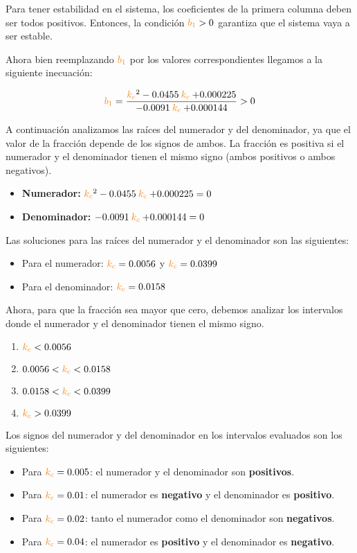 Para tener estabilidad en el sistema, los coeficientes de la primera columna
deben ser todos positivos. Entonces, la condición $\nara{b_1} > 0$ garantiza
que el sistema vaya a ser estable.

Ahora bien reemplazando $\nara{b_1}$ por los valores correspondientes llegamos a la siguiente inecuación:

\begin{equation}
    \nara{b_1} = \frac{\nara{k_c}^2  - 0.0455 \nara{k_c} + 0.000225}{-0.0091 \nara{k_c} + 0.000144} > 0
\end{equation}

A continuación analizamos las raíces del numerador y del denominador, ya que el valor de la fracción depende de los signos de ambos. La fracción es positiva si el numerador y el denominador tienen el mismo signo (ambos positivos o ambos negativos).

\begin{itemize}
    \item \textbf{Numerador:} \( \nara{k_c}^2 - 0.0455 \nara{k_c} + 0.000225 = 0 \)
    \item \textbf{Denominador:} \( -0.0091 \nara{k_c} + 0.000144 = 0 \)
\end{itemize}

Las soluciones para las raíces del numerador y el denominador son las siguientes:

\begin{itemize}
    \item Para el numerador: \( \nara{k_c} = 0.0056 \) y \( \nara{k_c} = 0.0399 \)
    \item Para el denominador: \( \nara{k_c} = 0.0158 \)
\end{itemize}

Ahora, para que la fracción sea mayor que cero, debemos analizar los intervalos donde el numerador y el denominador tienen el mismo signo.

\begin{enumerate}
    \item \( \nara{k_c} < 0.0056 \)
    \item \( 0.0056 < \nara{k_c} < 0.0158 \)
    \item \( 0.0158 < \nara{k_c} < 0.0399 \)
    \item \( \nara{k_c} > 0.0399 \)
\end{enumerate}

Los signos del numerador y del denominador en los intervalos evaluados son los siguientes:

\begin{itemize}
    \item Para \( \nara{k_c} = 0.005 \): el numerador y el denominador son \textbf{positivos}.
    \item Para \( \nara{k_c} = 0.01 \): el numerador es \textbf{negativo} y el denominador es \textbf{positivo}.
    \item Para \( \nara{k_c} = 0.02 \): tanto el numerador como el denominador son \textbf{negativos}.
    \item Para \( \nara{k_c} = 0.04 \): el numerador es \textbf{positivo} y el denominador es \textbf{negativo}.
\end{itemize}

